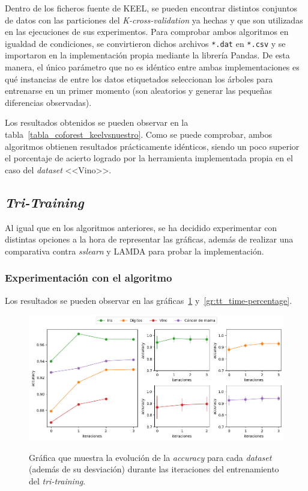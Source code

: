 Dentro de los ficheros fuente de KEEL, se pueden encontrar distintos conjuntos de datos con las particiones del \textit{K-cross-validation} ya hechas y que son utilizadas en las ejecuciones de sus experimentos. Para comprobar ambos algoritmos en igualdad de condiciones, se convirtieron dichos archivos \texttt{*.dat} en \texttt{*.csv} y se importaron en la implementación propia mediante la librería Pandas. De esta manera, el único parámetro que no es idéntico entre ambas implementaciones es qué instancias de entre los datos etiquetados seleccionan los árboles para entrenarse en un primer momento (son aleatorios y generar las pequeñas diferencias observadas).

Los resultados obtenidos se pueden observar en la tabla~\ref{tabla_coforest_keelvsnuestro}. Como se puede comprobar, ambos algoritmos obtienen resultados prácticamente idénticos, siendo un poco superior el porcentaje de acierto logrado por la herramienta implementada propia en el caso del \textit{dataset} <<Vino>>.


\subsection{\textit{Tri-Training}}

Al igual que en los algoritmos anteriores, se ha decidido experimentar con distintas opciones a la hora de representar las gráficas, además de realizar una comparativa contra \textit{sslearn} y LAMDA para probar la implementación.


\subsubsection{Experimentación con el algoritmo}

Los resultados se pueden observar en las gráficas~\ref{gr:tt_train-iterations} y~\ref{gr:tt_time-percentage}.

\begin{figure}[h]
	\caption[\textit{Tri-training}: resultados experimentación (iteraciones-entrenamiento)]{Gráfica que muestra la evolución de la \textit{accuracy} para cada \textit{dataset} (además de su desviación) durante las iteraciones del entrenamiento del \textit{tri-training}.}
	\centering
	\includegraphics[scale=0.5]{../img/memoria/5_tritraining_score-iteraciones}
	\label{gr:tt_train-iterations}
\end{figure}

